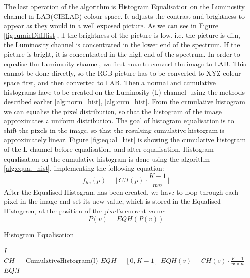 \documentclass[journal,transmag]{IEEEtran}
\begin{document}
The last operation of the algorithm is Histogram Equalisation on the Luminosity channel in LAB(CIELAB) colour space. It adjusts the contrast and brightness to appear as they would in a well exposed picture. As we can see in Figure \ref{fig:luminDiffHist}, if the brightness of the picture is low, i.e. the picture is dim, the Luminosity channel is concentrated in the lower end of the spectrum. If the picture is bright, it is concentrated in the high end of the spectrum. In order to equalise the Luminosity channel, we first have to convert the image to LAB. This cannot be done directly, so the RGB picture has to be converted to XYZ colour\cite{rgbTOxyz} space first, and then converted to LAB\cite{xyzTOlab}. Then a normal and cumulative histograms have to be created on the Luminosity (L) channel, using the methods described earlier \ref{alg:norm_hist}, \ref{alg:cum_hist}. From the cumulative histogram we can equalise the pixel distribution, so that the histogram of the image approximates a uniform distribution. The goal of histogram equalisation is to shift the pixels in the image, so that the resulting cumulative histogram is approximately linear. \cite{automaticContrast} Figure \ref{fig:equal_hist} is showing the cumulative histogram of the L channel before equalisation, and after equalisation. Histogram equalisation on the cumulative histogram is done using the algorithm \ref{alg:equal_hist}, implementing the following equation: 
\begin{equation}
f_{he}(p) = \lfloor CH(p) \cdot \frac{K - 1}{mn}\rfloor
\end{equation}
\noindent After the Equalised Histogram has been created, we have to loop through each pixel in the image and set its new value, which is stored in the Equalised Histogram, at the position of the pixel's current value: 
\begin{equation}\label{eq:histEqPixel}
P(v) = EQH(P(v))
\end{equation}
\begin{algorithm}[h!] %
	\caption{Histogram Equalisation}
	\label{alg:equal_hist}
	\begin{algorithmic}[1]
		 {$I$}\\ 
		\State
		\State $CH =$ CumulativeHistogram(I)
		\State $EQH = [0, K-1]$
		\State
		\State $EQH(v) = CH(v)\cdot\frac{K-1}{m \times n}$
		\EndFor
		\State 
		\State
		\Return $EQH$
		\EndFunction
	\end{algorithmic}
\end{algorithm}
\end{document}
